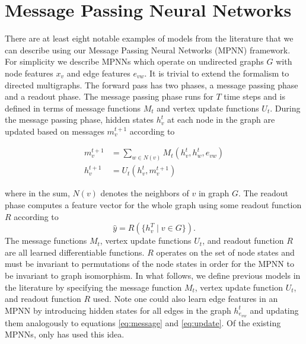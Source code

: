 \documentclass{article}
\begin{document}
\section{Message Passing Neural Networks} \label{sec:mpnn}
There are at least eight notable examples of models from the literature that we can describe using our Message Passing Neural Networks (MPNN) framework. For simplicity we describe MPNNs which operate on undirected graphs $G$ with node features $x_v$ and edge features $e_{vw}$. It is trivial to extend the formalism to directed multigraphs. The forward pass has two phases, a message passing phase and a readout phase. The message passing phase runs for $T$ time steps and is defined in terms of message functions $M_t$ and vertex update functions $U_t$. During the message passing phase, hidden states $h_v^{t}$ at each node in the graph are updated based on messages $m_v^{t+1}$ according to

\begin{align} \label{eq:message}
   m_v^{t+1} & = \sum\limits_{w \in N(v)} M_t(h_v^t, h_w^t, e_{vw}) \\
\label{eq:update}
  h_v^{t+1} & = U_t( h_v^t, m_v^{t+1})
\end{align}



 where in the sum, $N(v)$ denotes the neighbors of $v$ in graph $G$. The readout phase computes a feature vector for the whole graph using some readout function $R$ according to
\begin{equation} \label{eq:output}
   \hat{y} = R(\{h_v^T \mid v \in G \}).
\end{equation}
The message functions $M_t$, vertex update functions $U_t$, and readout function $R$ are all learned differentiable functions. $R$ operates on the set of node states and must be invariant to permutations of the node states in order for the MPNN to be invariant to graph isomorphism. In what follows, we define previous models in the literature by specifying the message function $M_t$, vertex update function $U_t$, and readout function $R$ used. Note one could also learn edge features in an MPNN by introducing hidden states for all edges in the graph $h_{e_{vw}}^t$ and updating them analogously to equations \ref{eq:message} and \ref{eq:update}. Of the existing MPNNs, only \citet{kearnes2016molecular} has used this idea. 
\end{document}
